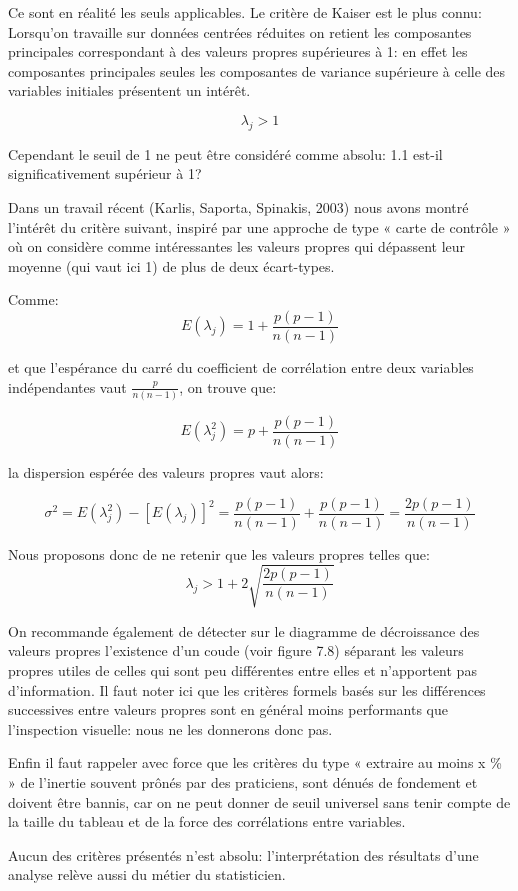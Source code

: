 \documentclass[12pt,a4paper]{article}
\begin{document}
Ce sont en réalité les seuls applicables. Le critère de Kaiser est le plus connu:
Lorsqu'on travaille sur données centrées réduites on retient les composantes principales
correspondant à des valeurs propres supérieures à 1: en effet les composantes principales
seules les composantes de variance supérieure à celle des variables initiales présentent un intérêt.

\[\lambda_j > 1\]

Cependant le seuil de 1 ne peut être considéré comme absolu: 1.1 est-il significativement
supérieur à 1?

Dans un travail récent (Karlis, Saporta, Spinakis, 2003) nous avons montré l'intérêt du
critère suivant, inspiré par une approche de type « carte de contrôle » où on considère comme
intéressantes les valeurs propres qui dépassent leur moyenne (qui vaut ici 1) de plus de deux
écart-types.

Comme:
\[E(\lambda_j) = 1 + \frac{p(p-1)}{n(n-1)}\]

et que l'espérance du carré du coefficient de corrélation entre deux variables indépendantes
vaut $\frac{p}{n(n-1)}$, on trouve que:

\[E(\lambda_j^2) = p + \frac{p(p-1)}{n(n-1)}\]

la dispersion espérée des valeurs propres vaut alors:

\[\sigma^2 = E(\lambda_j^2) - [E(\lambda_j)]^2 = \frac{p(p-1)}{n(n-1)} + \frac{p(p-1)}{n(n-1)} = \frac{2p(p-1)}{n(n-1)}\]

Nous proposons donc de ne retenir que les valeurs propres telles que:
\[\lambda_j > 1 + 2 \sqrt{\frac{2p(p-1)}{n(n-1)}}\]

On recommande également de détecter sur le diagramme de décroissance des valeurs
propres l'existence d'un coude (voir figure 7.8) séparant les valeurs propres utiles de celles
qui sont peu différentes entre elles et n'apportent pas d'information. Il faut noter ici que les
critères formels basés sur les différences successives entre valeurs propres sont en général
moins performants que l'inspection visuelle: nous ne les donnerons donc pas.

Enfin il faut rappeler avec force que les critères du type « extraire au moins x \% » de
l'inertie souvent prônés par des praticiens, sont dénués de fondement et doivent être bannis, car on ne peut donner de seuil universel sans tenir compte de la taille du tableau et de
la force des corrélations entre variables.

Aucun des critères présentés n'est absolu: l'interprétation des résultats d'une analyse
relève aussi du métier du statisticien.
\end{document}
